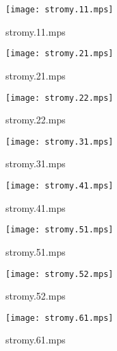 \documentclass[letterpaper,10pt]{article}
\begin{document}
\begin{figure}
    \centering
    \texttt{[image: stromy.11.mps]}
    \caption{stromy.11.mps}
\end{figure}

\begin{figure}
    \centering
    \texttt{[image: stromy.21.mps]}
    \caption{stromy.21.mps}
\end{figure}

\begin{figure}
    \centering
    \texttt{[image: stromy.22.mps]}
    \caption{stromy.22.mps}
\end{figure}

\begin{figure}
    \centering
    \texttt{[image: stromy.31.mps]}
    \caption{stromy.31.mps}
\end{figure}

\begin{figure}
    \centering
    \texttt{[image: stromy.41.mps]}
    \caption{stromy.41.mps}
\end{figure}

\begin{figure}
    \centering
    \texttt{[image: stromy.51.mps]}
    \caption{stromy.51.mps}
\end{figure}

\begin{figure}
    \centering
    \texttt{[image: stromy.52.mps]}
    \caption{stromy.52.mps}
\end{figure}

\begin{figure}
    \centering
    \texttt{[image: stromy.61.mps]}
    \caption{stromy.61.mps}
\end{figure}
\end{document}
